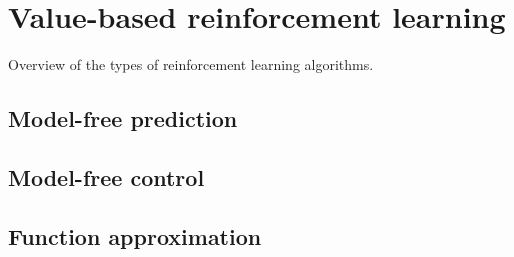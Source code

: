 \section{Value-based reinforcement learning}

\begin{marginfigure}
    \centering
    \caption{Overview of the types of reinforcement learning algorithms.}
    \label{fig:reinforcement-learning-algorithms}
\end{marginfigure}

\subsection{Model-free prediction}

\subsection{Model-free control}

\subsection{Function approximation}
